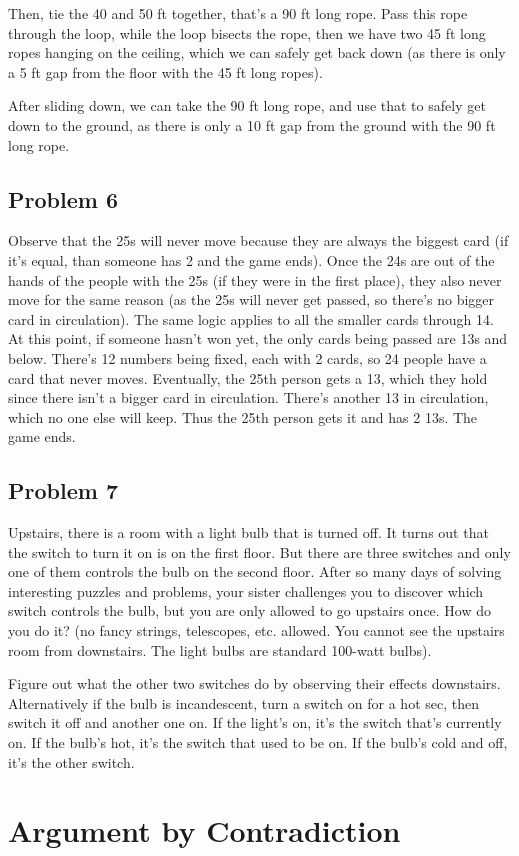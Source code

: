 \documentclass{article}
\begin{document}
Then, tie the 40 and 50 ft together, that’s a 90 ft long rope. Pass this rope through the loop, while the loop bisects the rope, then we have two 45 ft long ropes hanging on the ceiling, 
which we can safely get back down (as there is only a 5 ft gap from the floor with the 45 ft long ropes).

After sliding down, we can take the 90 ft long rope, and use that to safely get down to the ground, as there is only a 10 ft gap from the ground with the 90 ft long rope.


\hfill

\subsection{Problem 6}
Observe that the 25s will never move because they are always the biggest card (if it’s equal, than someone has 2 and the game ends). 
Once the 24s are out of the hands of the people with the 25s (if they were in the first place), they also never move for the same reason (as the 25s will never get passed, so there’s no bigger card in circulation). 
The same logic applies to all the smaller cards through 14. At this point, if someone hasn’t won yet, the only cards being passed are 13s and below. There’s 12 numbers being fixed, 
each with 2 cards, so 24 people have a card that never moves. Eventually, the 25th person gets a 13, which they hold since there isn’t a bigger card in circulation. 
There’s another 13 in circulation, which no one else will keep. Thus the 25th person gets it and has 2 13s. The game ends.


\hfill

\subsection{Problem 7}
Upstairs, there is a room with a light bulb that is turned off. It turns out that the switch to turn it on is on the first floor. But there are three switches and only one of them controls the bulb on the second floor. 
After so many days of solving interesting puzzles and problems, your sister challenges you to discover which switch controls the bulb, but you are only allowed to go upstairs once. 
How do you do it? (no fancy strings, telescopes, etc. allowed. You cannot see the upstairs room from downstairs. The light bulbs are standard 100-watt bulbs).

Figure out what the other two switches do by observing their effects downstairs. Alternatively if the bulb is incandescent, turn a switch on for a hot sec, then switch it off and another one on. If the light’s on, 
it's the switch that’s currently on. If the bulb’s hot, it's the switch that used to be on. If the bulb’s cold and off, it’s the other switch.


\hfill

\break

\section{Argument by Contradiction}
\end{document}

